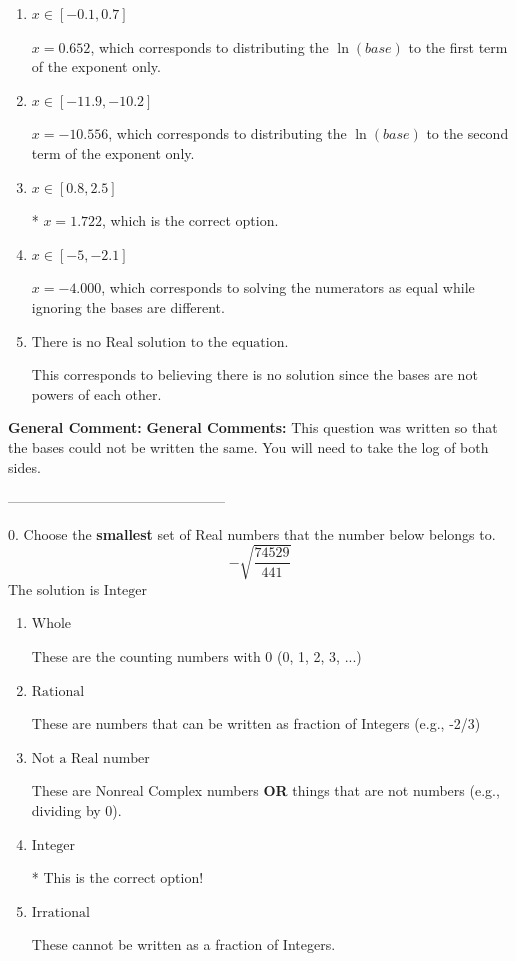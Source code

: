 \documentclass{extbook}[14pt]
\begin{document}
\begin{enumerate}[label=\Alph*.] 
\item $ x \in [-0.1, 0.7] $ 

 $x = 0.652$, which corresponds to distributing the $\ln(base)$ to the first term of the exponent only. 
\item $ x \in [-11.9, -10.2] $ 

 $x = -10.556$, which corresponds to distributing the $\ln(base)$ to the second term of the exponent only. 
\item $ x \in [0.8, 2.5] $ 

 * $x = 1.722$, which is the correct option. 
\item $ x \in [-5, -2.1] $ 

 $x = -4.000$, which corresponds to solving the numerators as equal while ignoring the bases are different. 
\item $ \text{There is no Real solution to the equation.} $ 

 This corresponds to believing there is no solution since the bases are not powers of each other. 
\end{enumerate} 
 
\textbf{General Comment:} \textbf{General Comments:} This question was written so that the bases could not be written the same. You will need to take the log of both sides. 

-----------------------------------------------

0. Choose the \textbf{smallest} set of Real numbers that the number below belongs to.
\[ -\sqrt{\frac{74529}{441}} \] 
The solution is $ \text{Integer} $ 

\begin{enumerate}[label=\Alph*.] 
\item $ \text{Whole} $ 

 These are the counting numbers with 0 (0, 1, 2, 3, ...) 
\item $ \text{Rational} $ 

 These are numbers that can be written as fraction of Integers (e.g., -2/3) 
\item $ \text{Not a Real number} $ 

 These are Nonreal Complex numbers \textbf{OR} things that are not numbers (e.g., dividing by 0). 
\item $ \text{Integer} $ 

 * This is the correct option! 
\item $ \text{Irrational} $ 

 These cannot be written as a fraction of Integers. 
\end{enumerate} 
 
\end{document}
